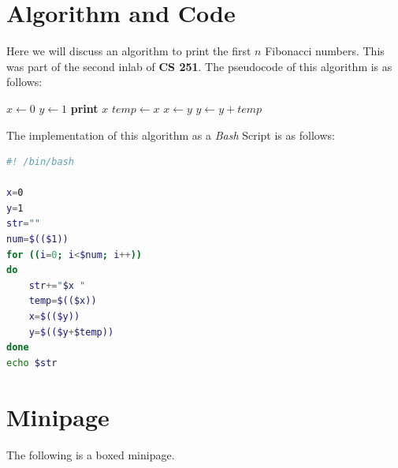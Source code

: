 \documentclass[12pt]{report}
\begin{document}
\chapter{Algorithm and Code}
Here we will discuss an algorithm to print the first $n$ Fibonacci numbers.
This was part of the second inlab of \textbf{CS 251}.
The pseudocode of this algorithm is as follows:
\begin{algorithmic}[1]
    \State $x \gets 0$
    \State $y \gets 1$
    \State \textbf{print} $x$
    \State $temp \gets x$
    \State $x \gets y$
    \State $y \gets y + temp$
    \EndFor
\end{algorithmic}
The implementation of this algorithm as a \textit{Bash} Script \cite{cs251} is as follows:

\begin{lstlisting}[language=bash,caption={Calculating the Fibonacci Numbers}]
#! /bin/bash

x=0
y=1
str=""
num=$(($1))
for ((i=0; i<$num; i++))
do
    str+="$x "
    temp=$(($x))
    x=$(($y))
    y=$(($y+$temp))
done
echo $str
\end{lstlisting}

\chapter{Minipage}
The following is a boxed minipage.\\


\end{document}
